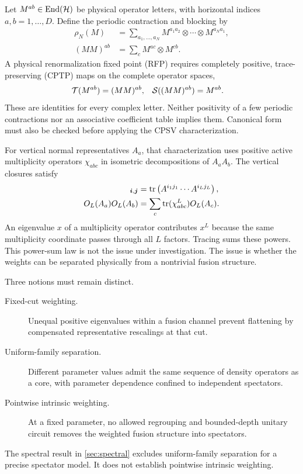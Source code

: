 \documentclass[aps,pra,reprint,nofootinbib,onecolumn]{revtex4-2}
\begin{document}
Let $M^{ab}\in\operatorname{End}(\mathcal{H})$ be physical operator letters, with horizontal
indices $a,b=1,\ldots,D$. Define the periodic contraction and blocking by
\begin{align}
	\rho_N(M)
	          & =\sum_{a_1,\ldots,a_N}
	M^{a_1a_2}\otimes\cdots\otimes M^{a_Na_1},
	\nonumber                                \\
	(MM)^{ab} & =\sum_cM^{ac}\otimes M^{cb}.
	\label{eq:definition}
\end{align}
A physical renormalization fixed point (RFP) requires completely
positive, trace-preserving (CPTP) maps on the complete operator spaces,
\begin{align}
	\mathcal{T}(M^{ab})    & =(MM)^{ab}, &
	\mathcal{S}((MM)^{ab}) & =M^{ab}.
	\label{eq:rfp}
\end{align}
These are identities for every complex letter. Neither positivity of
a few periodic contractions nor an associative coefficient table
implies them. Canonical form must also be checked before applying the
CPSV characterization.

For vertical normal representatives $A_a$, that characterization uses
positive active multiplicity operators $\chi_{abc}$ in isometric
decompositions of $A_aA_b$. The vertical closures satisfy
\begin{align}
	[O_L(A)]_{\boldsymbol i,\boldsymbol j}
	 & =\tr\left(A^{i_1j_1}\cdots A^{i_Lj_L}\right),
	\nonumber                                        \\
	O_L(A_a)O_L(A_b)
	 & =\sum_c\tr(\chi_{abc}^{L})O_L(A_c).
	\label{eq:vertical}
\end{align}
An eigenvalue $x$ of a multiplicity operator contributes $x^L$ because
the same multiplicity coordinate passes through all $L$ factors.
Tracing sums these powers. This power-sum law is not the issue under
investigation. The issue is whether the weights can be separated
physically from a nontrivial fusion structure.

Three notions must remain distinct.
\begin{description}
	\item[Fixed-cut weighting.]
	      Unequal positive eigenvalues within a fusion channel prevent flattening
	      by compensated representative rescalings at that cut.
	\item[Uniform-family separation.]
	      Different parameter values admit the same sequence of density
	      operators as a core, with parameter dependence confined to independent
	      spectators.
	\item[Pointwise intrinsic weighting.]
	      At a fixed parameter, no allowed regrouping and bounded-depth unitary
	      circuit removes the weighted fusion structure into spectators.
\end{description}
The spectral result in \cref{sec:spectral} excludes uniform-family
separation for a precise spectator model. It does not establish
pointwise intrinsic weighting.
\end{document}
